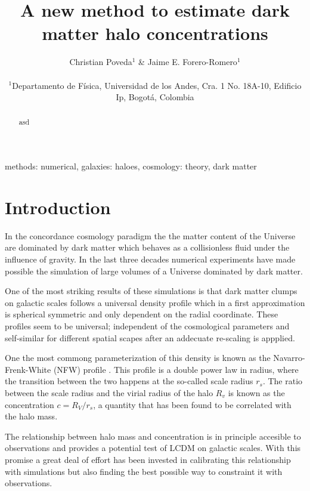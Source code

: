 \documentclass[useAMS,usenatbib]{mn2e}
\begin{document}
\title[New approach to Halo concentrations]{A new method to estimate
  dark matter halo concentrations}
\author[Poveda \& Forero-Romero]{
\parbox[t]{\textwidth}{\raggedright
  Christian Poveda$^{1}$ \&
  Jaime E. Forero-Romero$^{1}$
}
\vspace*{6pt}\\
$^{1}$Departamento de F\'{i}sica, Universidad de los Andes, Cra. 1
No. 18A-10, Edificio Ip, Bogot\'a, Colombia\\
}
\maketitle

\begin{abstract}
asd
\end{abstract}
\begin{keywords}
methods: numerical, galaxies: haloes, cosmology: theory, dark
matter
\end{keywords}


\section{Introduction}
\label{sec:introduction}
In the concordance cosmology paradigm the the matter content of the
Universe are dominated by dark matter which behaves as a collisionless
fluid under the influence of gravity. In the last three decades
numerical experiments have made possible the simulation of large
volumes of a Universe dominated by dark matter.

One of the most striking results of these simulations is that dark
matter clumps on galactic scales follows a universal density profile
which in a first approximation is spherical symmetric and only
dependent on the radial coordinate. These profiles seem to be
universal; independent of the cosmological parameters and self-similar
for different spatial scapes after an addecuate re-scaling is
appplied.

One the most commong parameterization of this density is known as the
Navarro-Frenk-White (NFW) profile \citep{NFW}. This profile is a
double power law in radius, where the transition between the two
happens at the so-called scale radius $r_s$. The ratio between the
scale radius and the virial radius of the halo $R_v$ is known as the
concentration $c=R_V/r_s$, a quantity that has been found to be
correlated with the halo mass.

The relationship between halo mass and concentration is in principle
accesible to observations and provides a potential test of LCDM on
galactic scales. With this promise a great deal of effort has been
invested in calibrating this relationship with simulations but also
finding the best possible way to constraint it with observations.
\end{document}
